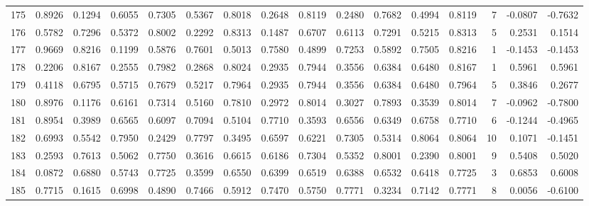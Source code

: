 \begin{tabular}{lrrrrrrrrrrrrrrr}
175 &      0.8926 &  0.1294 &  0.6055 &  0.7305 &  0.5367 &  0.8018 &  0.2648 &  0.8119 &  0.2480 &  0.7682 &   0.4994 &     0.8119 &      7 &                   -0.0807 &                    -0.7632 \\
176 &      0.5782 &  0.7296 &  0.5372 &  0.8002 &  0.2292 &  0.8313 &  0.1487 &  0.6707 &  0.6113 &  0.7291 &   0.5215 &     0.8313 &      5 &                    0.2531 &                     0.1514 \\
177 &      0.9669 &  0.8216 &  0.1199 &  0.5876 &  0.7601 &  0.5013 &  0.7580 &  0.4899 &  0.7253 &  0.5892 &   0.7505 &     0.8216 &      1 &                   -0.1453 &                    -0.1453 \\
178 &      0.2206 &  0.8167 &  0.2555 &  0.7982 &  0.2868 &  0.8024 &  0.2935 &  0.7944 &  0.3556 &  0.6384 &   0.6480 &     0.8167 &      1 &                    0.5961 &                     0.5961 \\
179 &      0.4118 &  0.6795 &  0.5715 &  0.7679 &  0.5217 &  0.7964 &  0.2935 &  0.7944 &  0.3556 &  0.6384 &   0.6480 &     0.7964 &      5 &                    0.3846 &                     0.2677 \\
180 &      0.8976 &  0.1176 &  0.6161 &  0.7314 &  0.5160 &  0.7810 &  0.2972 &  0.8014 &  0.3027 &  0.7893 &   0.3539 &     0.8014 &      7 &                   -0.0962 &                    -0.7800 \\
181 &      0.8954 &  0.3989 &  0.6565 &  0.6097 &  0.7094 &  0.5104 &  0.7710 &  0.3593 &  0.6556 &  0.6349 &   0.6758 &     0.7710 &      6 &                   -0.1244 &                    -0.4965 \\
182 &      0.6993 &  0.5542 &  0.7950 &  0.2429 &  0.7797 &  0.3495 &  0.6597 &  0.6221 &  0.7305 &  0.5314 &   0.8064 &     0.8064 &     10 &                    0.1071 &                    -0.1451 \\
183 &      0.2593 &  0.7613 &  0.5062 &  0.7750 &  0.3616 &  0.6615 &  0.6186 &  0.7304 &  0.5352 &  0.8001 &   0.2390 &     0.8001 &      9 &                    0.5408 &                     0.5020 \\
184 &      0.0872 &  0.6880 &  0.5743 &  0.7725 &  0.3599 &  0.6550 &  0.6399 &  0.6519 &  0.6388 &  0.6532 &   0.6418 &     0.7725 &      3 &                    0.6853 &                     0.6008 \\
185 &      0.7715 &  0.1615 &  0.6998 &  0.4890 &  0.7466 &  0.5912 &  0.7470 &  0.5750 &  0.7771 &  0.3234 &   0.7142 &     0.7771 &      8 &                    0.0056 &                    -0.6100 \\

\end{tabular}
